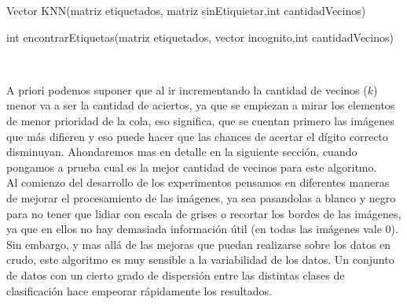 \begin{algorithm}
\begin{algorithmic}[1]\parskip=1mm
\caption{Vector KNN(matriz etiquetados, matriz sinEtiquietar,int cantidadVecinos)}
\ENDFOR
{}
\end{algorithmic}
\end{algorithm}

\begin{algorithm}
\begin{algorithmic}[1]\parskip=1mm
\caption{int encontrarEtiquetas(matriz etiquetados, vector incognito,int cantidadVecinos)}
\ENDFOR
{}
\ENDWHILE\\
\end{algorithmic}
\end{algorithm}

A priori podemos suponer que al ir incrementando la cantidad de vecinos ($k$) menor va a ser la cantidad de aciertos, ya que se empiezan a mirar los elementos de menor prioridad de la cola, eso significa, que se cuentan primero las imágenes que más difieren y eso puede hacer que las chances de acertar el dígito correcto disminuyan. Ahondaremos mas en detalle en la siguiente sección, cuando pongamos a prueba cual es la mejor cantidad de vecinos para este algoritmo.
\\
Al comienzo del desarrollo de los experimentos pensamos en diferentes maneras de mejorar el procesamiento de las imágenes, ya sea pasandolas a blanco y negro para no tener que lidiar con escala de grises o recortar los bordes de las imágenes, ya que en ellos no hay demasiada información útil (en todas las imágenes vale 0).
\\
Sin embargo, y mas allá de las mejoras que puedan realizarse sobre los datos en crudo, este algoritmo es muy sensible a la variabilidad de los datos. Un conjunto de datos con un cierto grado de dispersión entre las distintas clases de clasificación hace empeorar rápidamente los resultados.

